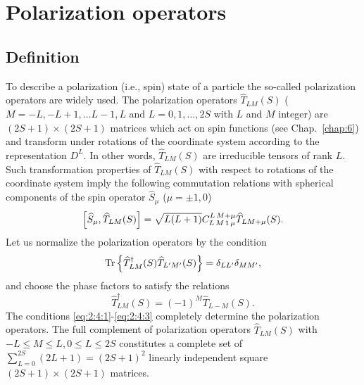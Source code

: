 \section{Polarization operators}\label{sec:2.4}
\subsection{Definition}
To describe a polarization (i.e., spin) state of a particle the so-called polarization operators are widely used. The polarization operators $\widehat{T}_{L M}(S)$ ($M=-L,-L+1, \ldots L-1, L$ and $L=0,1, \ldots, 2 S$ with $L$ and $M$ integer) are $(2 S+1) \times(2 S+1)$ matrices which act on spin functions (see Chap.~\ref{chap:6}) and transform under rotations of the coordinate system according to the representation $D^{L}$. In other words, $\widehat{T}_{L M}(S)$ are irreducible tensors of rank $L$. Such transformation properties of $\widehat{T}_{L M}(S)$ with respect to rotations of the coordinate system imply the following commutation relations with spherical components of the spin operator $\widehat{S}_{\mu}$ ($\mu= \pm 1,0$)
\begin{equation}
\left[\widehat{S}_{\mu}, \widehat{T}_{L M}(S)\right]=\sqrt{L(L+1)} C_{L\,M\,1\,\mu}^{L\,M+\mu} \widehat{T}_{L M+\mu}(S) . \label{eq:2:4:1}
\end{equation}
Let us normalize the polarization operators by the condition
\begin{equation}
\operatorname{Tr} \left\{\widehat{T}_{L M}^{\dagger}(S) \widehat{T}_{L^{\prime} M^{\prime}}(S)\right\}=\delta_{L L^{\prime}} \delta_{M M^{\prime}}, \label{eq:2:4:2}
\end{equation}
and choose the phase factors to satisfy the relations
\begin{equation}
\widehat{T}_{L M}^{\dagger}(S)=(-1)^{M} \widehat{T}_{L-M}(S) . \label{eq:2:4:3}
\end{equation}
The conditions \eqref{eq:2:4:1}-\eqref{eq:2:4:3} completely determine the polarization operators. The full complement of polarization operators $\hat{T}_{L M}(S)$ with $-L \leq M \leq L, 0 \leq L \leq 2 S$ constitutes a complete set of $\sum_{L=0}^{2 S}(2 L+1)=(2 S+1)^{2}$ linearly independent square $(2 S+1) \times(2 S+1)$ matrices.


